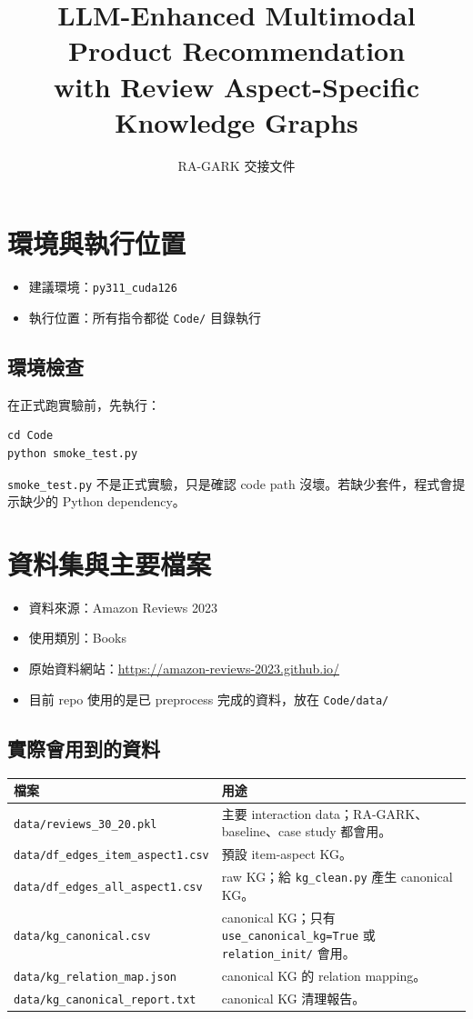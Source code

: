 \documentclass[12pt,a4paper,fontset=none]{ctexart}
\title{LLM-Enhanced Multimodal Product Recommendation\\
with Review Aspect-Specific Knowledge Graphs}
\author{RA-GARK 交接文件}
\date{}
\newcommand{\cmd}[1]{\texttt{#1}}
\begin{document}
\pagestyle{plain}
\maketitle

\section{環境與執行位置}

\begin{itemize}
  \item 建議環境：\cmd{py311\_cuda126}
  \item 執行位置：所有指令都從 \cmd{Code/} 目錄執行
\end{itemize}

\subsection{環境檢查}

在正式跑實驗前，先執行：

\begin{verbatim}
cd Code
python smoke_test.py
\end{verbatim}

\cmd{smoke\_test.py} 不是正式實驗，只是確認 code path 沒壞。若缺少套件，程式會提示缺少的 Python dependency。

\section{資料集與主要檔案}

\begin{itemize}
  \item 資料來源：Amazon Reviews 2023
  \item 使用類別：Books
  \item 原始資料網站：\url{https://amazon-reviews-2023.github.io/}
  \item 目前 repo 使用的是已 preprocess 完成的資料，放在 \cmd{Code/data/}
\end{itemize}

\subsection{實際會用到的資料}

\begin{tabularx}{\textwidth}{p{}X}
\textbf{檔案} & \textbf{用途} \\
\hline
\cmd{data/reviews\_30\_20.pkl} & 主要 interaction data；RA-GARK、baseline、case study 都會用。 \\
\cmd{data/df\_edges\_item\_aspect1.csv} & 預設 item-aspect KG。 \\
\cmd{data/df\_edges\_all\_aspect1.csv} & raw KG；給 \cmd{kg\_clean.py} 產生 canonical KG。 \\
\cmd{data/kg\_canonical.csv} & canonical KG；只有 \cmd{use\_canonical\_kg=True} 或 \cmd{relation\_init/} 會用。 \\
\cmd{data/kg\_relation\_map.json} & canonical KG 的 relation mapping。 \\
\cmd{data/kg\_canonical\_report.txt} & canonical KG 清理報告。 \\
\end{tabularx}
\end{document}

